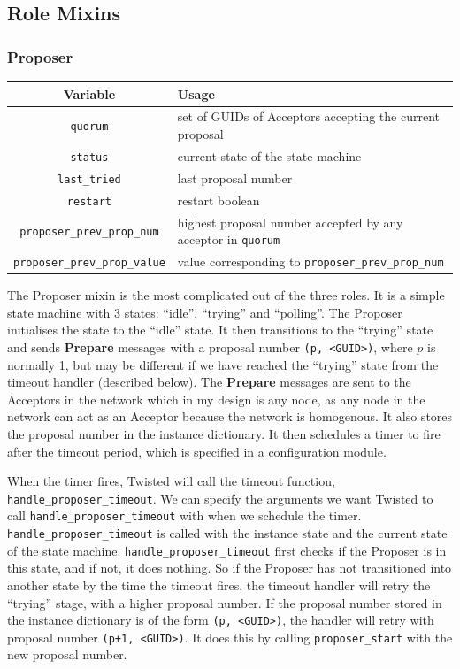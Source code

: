 \documentclass[12pt,twoside,notitlepage]{report}
\newcommand{\msg}[1] {{\bf #1}}         %
\begin{document}
\subsection{Role Mixins}

\subsubsection{Proposer}


\begin{tabular}{ | c | p{7cm} | }
  \hline
  {\bf Variable} & {\bf Usage} \\ \hline
  \verb+quorum+ & set of GUIDs of Acceptors accepting the current proposal \\ \hline
  \verb+status+ & current state of the state machine \\ \hline
  \verb+last_tried+ & last proposal number \\ \hline
  \verb+restart+ & restart boolean \\ \hline
  \verb+proposer_prev_prop_num+ & highest proposal number accepted by any acceptor in \verb+quorum+ \\ \hline
  \verb+proposer_prev_prop_value+  & value corresponding to \verb+proposer_prev_prop_num+ \\ \hline
\end{tabular}


The Proposer mixin is the most complicated out of the three roles. It is a simple state
machine with 3 states: ``idle'', ``trying'' and ``polling''. The Proposer initialises the state to
the ``idle'' state. It then transitions to the ``trying'' state and sends \msg{Prepare} messages
with a proposal number \verb+(p, <GUID>)+, where $p$ is normally 1, but may be different if we
have reached the ``trying'' state from the timeout handler (described below). The \msg{Prepare}
messages are sent to the Acceptors in the network which in my design is any node, as any node in
the network can act as an Acceptor because the network is homogenous. It also stores the proposal
number in the instance dictionary. It then schedules a timer to fire after the timeout period,
which is specified in a configuration module.

When the timer fires, Twisted will call the timeout function, \verb+handle_proposer_timeout+. We
can specify the arguments we want Twisted to call \verb+handle_proposer_timeout+ with when we
schedule the timer. \verb+handle_proposer_timeout+ is called with the instance state and the
current state of the state machine. \verb+handle_proposer_timeout+ first checks if the Proposer is
in this state, and if not, it does nothing. So if the Proposer has not transitioned into another
state by the time the timeout fires, the timeout handler will retry the ``trying'' stage, with a
higher proposal number. If the proposal number stored in the instance dictionary is of the form
\verb+(p, <GUID>)+, the handler will retry with proposal number \verb$(p+1, <GUID>)$. It does this
by calling \verb+proposer_start+ with the new proposal number.
\end{document}

